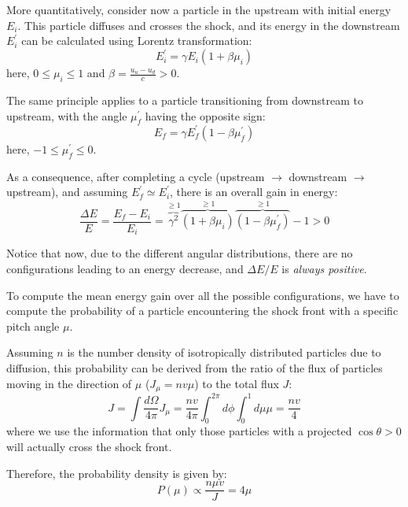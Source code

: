 More quantitatively, consider now a particle in the upstream with initial energy \( E_i \). 
%
This particle diffuses and crosses the shock, and its energy in the downstream \( E_i^\prime \) can be calculated using Lorentz transformation:
%
\begin{equation}
E_i^\prime = \gamma E_i \left( 1 + \beta \mu_i \right)
\end{equation}
%
here, \( 0 \le \mu_i \le 1 \) and \( \beta = \frac{u_u - u_d}{c} > 0 \).

The same principle applies to a particle transitioning from downstream to upstream, with the angle \( \mu_f^\prime \) having the opposite sign:
%
\begin{equation}
E_f = \gamma E^\prime_f (1 - \beta \mu_f^\prime)
\end{equation}
here, \( -1 \le \mu_f^\prime \le 0 \).

As a consequence, after completing a cycle (upstream $\rightarrow$ downstream $\rightarrow$ upstream), and assuming \( E^\prime_f \simeq E^\prime_i \), there is an overall gain in energy:
%
\begin{equation}
\frac{\Delta E}{E} = \frac{E_f - E_i}{E_i} = \overbrace{\gamma^2}^{\ge 1} \overbrace{(1 + \beta \mu_i)}^{\ge 1} \overbrace{(1 - \beta \mu_f^\prime)}^{\ge 1} - 1 > 0
\end{equation}

Notice that now, due to the different angular distributions, there are no configurations leading to an energy decrease, and \( \Delta E / E \) is \emph{always positive}.

To compute the mean energy gain over all the possible configurations, we have to compute the probability of a particle encountering the shock front with a specific pitch angle \( \mu \). 

Assuming \( n \) is the number density of isotropically distributed particles due to diffusion, this probability can be derived from the ratio of the flux of particles moving in the direction of \( \mu \) (\( J_\mu = n v \mu \)) to the total flux \( J \):
%
\begin{equation}
J = \int \frac{d\Omega}{4\pi} J_\mu = \frac{n v}{4\pi} \int_0^{2\pi} d\phi \int_0^1 d\mu \mu = \frac{n v}{4}
\end{equation}
%
where we use the information that only those particles with a projected \( \cos \theta > 0 \) will actually cross the shock front.

Therefore, the probability density is given by:
%
\begin{equation}
P(\mu) \propto \frac{n \mu v}{J} = 4 \mu
\end{equation}

